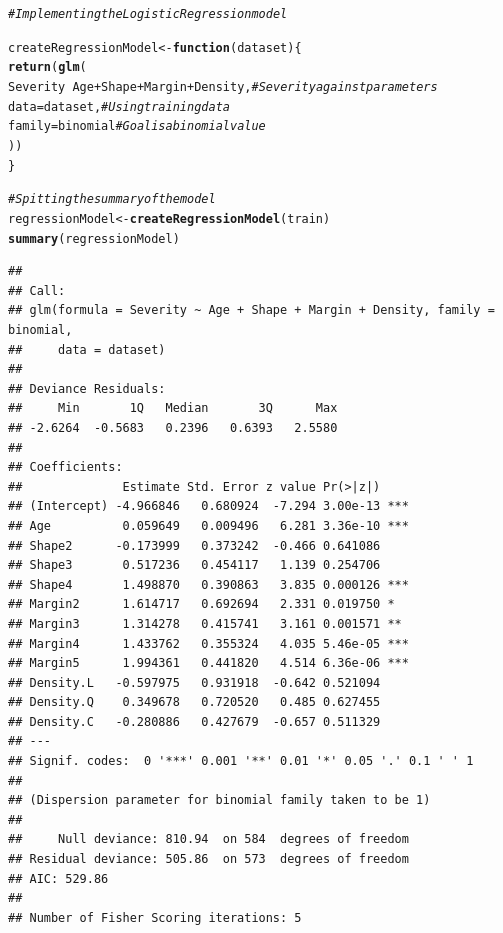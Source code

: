 \documentclass[a4paper,12pt]{article}\usepackage[]{graphicx}\usepackage[]{color}
\makeatletter
\newcommand{\hlcom}[1]{\textcolor[rgb]{0.678,0.584,0.686}{\textit{#1}}}%
\newcommand{\hlopt}[1]{\textcolor[rgb]{0,0,0}{#1}}%
\newcommand{\hlstd}[1]{\textcolor[rgb]{0.345,0.345,0.345}{#1}}%
\newcommand{\hlkwa}[1]{\textcolor[rgb]{0.161,0.373,0.58}{\textbf{#1}}}%
\newcommand{\hlkwb}[1]{\textcolor[rgb]{0.69,0.353,0.396}{#1}}%
\newcommand{\hlkwc}[1]{\textcolor[rgb]{0.333,0.667,0.333}{#1}}%
\newcommand{\hlkwd}[1]{\textcolor[rgb]{0.737,0.353,0.396}{\textbf{#1}}}%
\newenvironment{kframe}{%
 \def\at@end@of@kframe{}%
 \ifinner\ifhmode%
  \def\at@end@of@kframe{\end{minipage}}%
  \begin{minipage}{\columnwidth}%
 \fi\fi%
 \def\FrameCommand##1{\hskip\@totalleftmargin \hskip-\fboxsep
 \colorbox{shadecolor}{##1}\hskip-\fboxsep
     \hskip-\linewidth \hskip-\@totalleftmargin \hskip\columnwidth}%
 \MakeFramed {\advance\hsize-\width
   \@totalleftmargin\z@ \linewidth\hsize
   \@setminipage}}%
 {\par\unskip\endMakeFramed%
 \at@end@of@kframe}
\newenvironment{knitrout}{}{} %
\makeatother
\begin{document}
\begin{knitrout}
\color{fgcolor}\begin{kframe}
\begin{alltt}
\hlcom{# Implementing the Logistic Regression model}

\hlstd{createRegressionModel} \hlkwb{<-} \hlkwa{function} \hlstd{(}\hlkwc{dataset}\hlstd{) \{}
  \hlkwd{return}\hlstd{(} \hlkwd{glm}\hlstd{(}
    \hlstd{Severity} \hlopt{~} \hlstd{Age}\hlopt{+}\hlstd{Shape}\hlopt{+}\hlstd{Margin}\hlopt{+}\hlstd{Density,} \hlcom{# Severity against parameters}
    \hlkwc{data}\hlstd{=dataset,}                        \hlcom{# Using training data}
    \hlkwc{family}\hlstd{=binomial}                      \hlcom{# Goal is a binomial value}
  \hlstd{))}
\hlstd{\}}

\hlcom{# Spitting the summary of the model}
\hlstd{regressionModel} \hlkwb{<-} \hlkwd{createRegressionModel}\hlstd{(train)}
\hlkwd{summary}\hlstd{(regressionModel)}
\end{alltt}
\begin{verbatim}
## 
## Call:
## glm(formula = Severity ~ Age + Shape + Margin + Density, family = binomial, 
##     data = dataset)
## 
## Deviance Residuals: 
##     Min       1Q   Median       3Q      Max  
## -2.6264  -0.5683   0.2396   0.6393   2.5580  
## 
## Coefficients:
##              Estimate Std. Error z value Pr(>|z|)    
## (Intercept) -4.966846   0.680924  -7.294 3.00e-13 ***
## Age          0.059649   0.009496   6.281 3.36e-10 ***
## Shape2      -0.173999   0.373242  -0.466 0.641086    
## Shape3       0.517236   0.454117   1.139 0.254706    
## Shape4       1.498870   0.390863   3.835 0.000126 ***
## Margin2      1.614717   0.692694   2.331 0.019750 *  
## Margin3      1.314278   0.415741   3.161 0.001571 ** 
## Margin4      1.433762   0.355324   4.035 5.46e-05 ***
## Margin5      1.994361   0.441820   4.514 6.36e-06 ***
## Density.L   -0.597975   0.931918  -0.642 0.521094    
## Density.Q    0.349678   0.720520   0.485 0.627455    
## Density.C   -0.280886   0.427679  -0.657 0.511329    
## ---
## Signif. codes:  0 '***' 0.001 '**' 0.01 '*' 0.05 '.' 0.1 ' ' 1
## 
## (Dispersion parameter for binomial family taken to be 1)
## 
##     Null deviance: 810.94  on 584  degrees of freedom
## Residual deviance: 505.86  on 573  degrees of freedom
## AIC: 529.86
## 
## Number of Fisher Scoring iterations: 5
\end{verbatim}
\end{kframe}
\end{knitrout}
\end{document}
